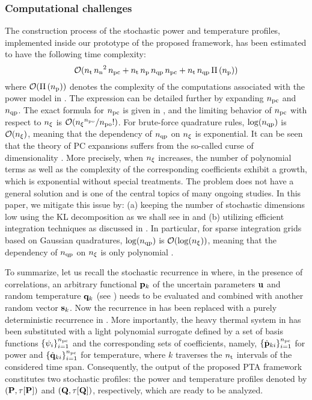 \subsubsection{Computational challenges} 
The construction process of the stochastic power and temperature profiles, implemented inside our prototype of the proposed framework, has been estimated to have the following time complexity:
\[
  \O(\nsteps \, \nnodes^2 \, \pcterms + \nsteps \, \nprocs \, \qdorder \, \pcterms + \nsteps \, \qdorder \, \oPower{\nprocs})
\]
where $\O(\oPower{\nprocs})$ denotes the complexity of the computations associated with the power model in .
The expression can be detailed further by expanding ${n_\text{pc}}$ and ${n_\text{qp}}$.
The exact formula for ${n_\text{pc}}$ is given in , and the limiting behavior of ${n_\text{pc}}$ with respect to ${n_\xi}$ is $\mathcal{O}({n_\xi}^{n_\text{po}} / {n_\text{po}}!)$.
For brute-force quadrature rules, $\log({n_\text{qp}})$ is $\mathcal{O}({n_\xi})$, meaning that the dependency of ${n_\text{qp}}$ on ${n_\xi}$ is exponential.
It can be seen that the theory of PC expansions suffers from the so-called curse of dimensionality \cite{xiu2010, eldred2008}.
More precisely, when ${n_\xi}$ increases, the number of polynomial terms as well as the complexity of the corresponding coefficients exhibit a growth, which is exponential without special treatments.
The problem does not have a general solution and is one of the central topics of many ongoing studies.
In this paper, we mitigate this issue by: (a) keeping the number of stochastic dimensions low using the KL decomposition as we shall see in  and (b) utilizing efficient integration techniques as discussed in .
In particular, for sparse integration grids based on Gaussian quadratures, $\log({n_\text{qp}})$ is $\mathcal{O}(\log({n_\xi}))$, meaning that the dependency of ${n_\text{qp}}$ on ${n_\xi}$ is only polynomial \cite{heiss2008}.

To summarize, let us recall the stochastic recurrence in  where, in the presence of correlations, an arbitrary functional $\mathbf{p}_k$ of the uncertain parameters $\mathbf{u}$ and random temperature $\mathbf{q}_k$ (see ) needs to be evaluated and combined with another random vector $\mathbf{s}_k$.
Now the recurrence in  has been replaced with a purely deterministic recurrence in .
More importantly, the heavy thermal system in  has been substituted with a light polynomial surrogate defined by a set of basis functions $\{ \psi_i \}_{i = 1}^{n_\text{pc}}$ and the corresponding sets of coefficients, namely, $\{ \hat{\mathbf{p}}_{ki} \}_{i = 1}^{n_\text{pc}}$ for power and $\{ \hat{\mathbf{q}}_{ki} \}_{i = 1}^{n_\text{pc}}$ for temperature, where $k$ traverses the ${n_\text{t}}$ intervals of the considered time span.
Consequently, the output of the proposed PTA framework constitutes two stochastic profiles: the power and temperature profiles denoted by $\profileP$ and $\profileT$, respectively, which are ready to be analyzed.

